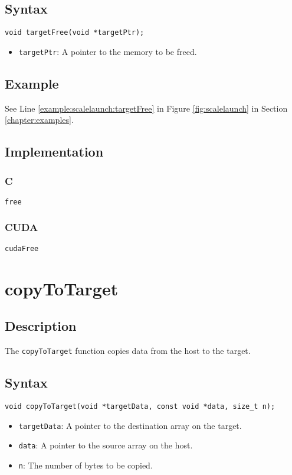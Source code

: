 \subsection{Syntax}
\begin{verbatim}
void targetFree(void *targetPtr);
\end{verbatim}

\begin{itemize}
\item \verb+targetPtr+: A pointer to the memory to be freed.
\end{itemize}


\subsection{Example}
See Line \ref{example:scalelaunch:targetFree} in Figure \ref{fig:scalelaunch} in Section \ref{chapter:examples}.

\subsection{Implementation}
\subsubsection{C}
\verb+free+
\subsubsection{CUDA}
\verb+cudaFree+

\newpage
\section{copyToTarget}

\subsection{Description}

The \verb+copyToTarget+ function copies data from the host to the target.

\subsection{Syntax}
\begin{verbatim}
void copyToTarget(void *targetData, const void *data, size_t n);
\end{verbatim}

\begin{itemize}
\item \verb+targetData+: A pointer to the destination array on the target.
\item \verb+data+: A pointer to the source array on the host.
\item \verb+n+: The number of bytes to be copied.
\end{itemize}


